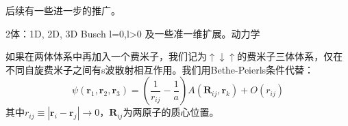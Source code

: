{\color{red}后续有一些进一步的推广。}

2体：1D, 2D, 3D Busch l=0,l>0 及一些准一维扩展。动力学 \cite{Idziaszek2bdynamics}



如果在两体体系中再加入一个费米子，我们记为$\uparrow\downarrow\uparrow$的费米子三体体系，仅在不同自旋费米子之间有s波散射相互作用\cite{OlshaniiRigorous2001,Petrov2003unitary3b,Fleix2006prlunitary3b,Felix2006praunitary3b,LmDuan2007levelcrossing,Stetcu2007,Blume2008,Blume2010,Xiaji2009prl,Xiaji20103b,Rittenhouse2010green}。我们用Bethe-Peierls条件代替：
\begin{equation}
\psi\left(\mathbf{r}_{1}, \mathbf{r}_{2}, \mathbf{r}_{3}\right)=\left(\frac{1}{r_{i j}}-\frac{1}{a}\right) A\left(\mathbf{R}_{i j}, \mathbf{r}_{k}\right)+O\left(r_{i j}\right)
\end{equation}
其中$r_{i j} \equiv\left|\mathbf{r}_{i}-\mathbf{r}_{j}\right| \rightarrow 0$，$\mathbf{R}_{ij}$为两原子的质心位置。

